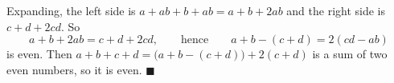 Expanding, the left side is $a+ab+b+ab=a+b+2ab$ and the right side is $c+d+2cd$. So
\[
a+b+2ab=c+d+2cd,\qquad\text{hence}\qquad a+b-(c+d)=2(cd-ab)
\]
is even. Then $a+b+c+d=\bigl(a+b-(c+d)\bigr)+2(c+d)$ is a sum of two even numbers, so it is even. $\blacksquare$
